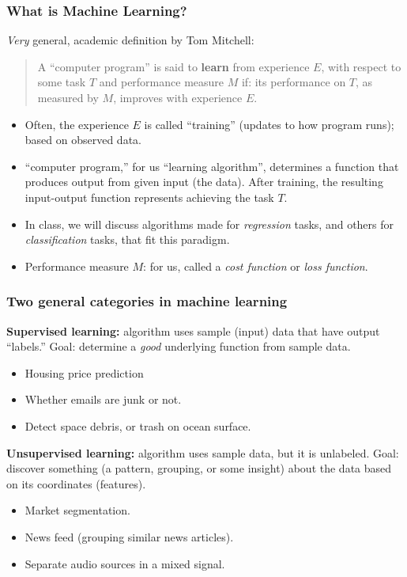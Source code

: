 \documentclass{beamer}
\theoremstyle{example}
\begin{document}
\begin{frame}
\frametitle{What is Machine Learning?}
    \textit{Very} general, academic definition by Tom Mitchell:\newline 
    \begin{quote}
        A ``computer program'' is said to \textbf{learn} from experience $E$, with respect to some task $T$ and performance measure $M$ if: its performance on $T$, as measured by $M$, improves with experience $E$.
    \end{quote}
    \vspace*{-12pt}
    \pause
    \begin{itemize}
        \item Often, the experience $E$ is called ``training'' (updates to how program runs); based on observed data.
        \pause
        \item ``computer program,'' for us ``learning algorithm'', determines a function that produces output from given input (the data). After training, the resulting input-output function represents achieving the task $T$. 
        \pause
        \item In class, we will discuss algorithms made for \textit{regression} tasks, and others for \textit{classification} tasks, that fit this paradigm.
        \pause 
        \item Performance measure $M$: for us, called a \textit{cost function} or \textit{loss function}.
    \end{itemize}

\end{frame}

\begin{frame}
\frametitle{Two general categories in machine learning}

\textbf{Supervised learning:} algorithm uses sample (input) data that have output ``labels.'' Goal: determine a \emph{good} underlying function from sample data.
\pause
    \begin{itemize}
        \item Housing price prediction
        \pause
        \item Whether emails are junk or not.
        \pause
        \item Detect space debris, or trash on ocean surface.
    \end{itemize}
\pause
\textbf{Unsupervised learning:} algorithm uses sample data, but it is unlabeled. Goal: discover something (a pattern, grouping, or some insight) about the data based on its coordinates (features).
\pause
    \begin{itemize}
        \item Market segmentation.
        \pause
        \item News feed (grouping similar news articles).
        \pause
        \item Separate audio sources in a mixed signal.
    \end{itemize}

\end{frame}
\end{document}
